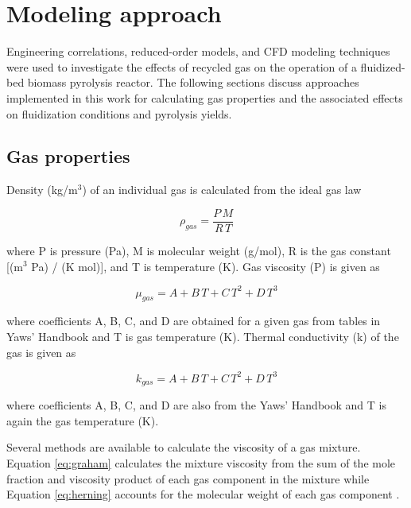 
\section{Modeling approach}

Engineering correlations, reduced-order models, and CFD modeling techniques were used to investigate the effects of recycled gas on the operation of a fluidized-bed biomass pyrolysis reactor. The following sections discuss approaches implemented in this work for calculating gas properties and the associated effects on fluidization conditions and pyrolysis yields.

\subsection{Gas properties}

Density (kg/m$^3$) of an individual gas is calculated from the ideal gas law

\begin{equation}
    \rho_{gas} = \frac{P\,M}{R\,T}
\end{equation}

\noindent where P is pressure (Pa), M is molecular weight (g/mol), R is the gas constant [(m$^3$ Pa) / (K mol)], and T is temperature (K). Gas viscosity (\textmugreek P) is given as

\begin{equation}
    \mu_{gas} = A + B\,T + C\,T^2 + D\,T^3
\end{equation}

\noindent where coefficients A, B, C, and D are obtained for a given gas from tables in Yaws' Handbook and T is gas temperature (K). Thermal conductivity (k) of the gas is given as

\begin{equation}
    k_{gas} = A + B\,T + C\,T^2 + D\,T^3
\end{equation}

\noindent where coefficients A, B, C, and D are also from the Yaws' Handbook and T is again the gas temperature (K).

Several methods are available to calculate the viscosity of a gas mixture. Equation \ref{eq:graham} calculates the mixture viscosity from the sum of the mole fraction and viscosity product of each gas component in the mixture \cite{Graham-1846} while Equation \ref{eq:herning} accounts for the molecular weight of each gas component \cite{Herning-1936}.

